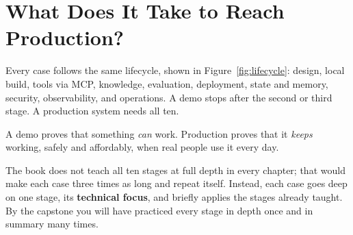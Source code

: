 \section{What Does It Take to Reach Production?}
\label{sec:lifecycle}

Every case follows the same lifecycle, shown in Figure~\ref{fig:lifecycle}: design, local build, tools via MCP, knowledge, evaluation, deployment, state and memory, security, observability, and operations. A demo stops after the second or third stage. A production system needs all ten.

\begin{keyidea}
A demo proves that something \emph{can} work. Production proves that it \emph{keeps} working, safely and affordably, when real people use it every day.
\end{keyidea}

The book does not teach all ten stages at full depth in every chapter; that would make each case three times as long and repeat itself. Instead, each case goes deep on one stage, its \textbf{technical focus}, and briefly applies the stages already taught. By the capstone you will have practiced every stage in depth once and in summary many times.

